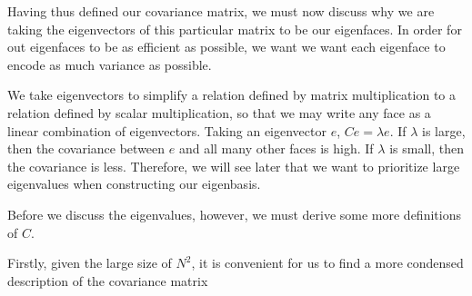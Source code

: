 \documentclass[12pt]{report}
\begin{document}
            Having thus defined our covariance matrix, we must now discuss why we are taking the eigenvectors of this particular matrix to be our eigenfaces. In order for out eigenfaces to be as efficient as possible, we want we want each eigenface to encode as much variance as possible. 
            
            We take eigenvectors to simplify a relation defined by matrix multiplication to a relation defined by scalar multiplication, so that we may write any face as a linear combination of eigenvectors. Taking an eigenvector $e$, $C e = \lambda e$. If $\lambda$ is large, then the covariance between $e$ and all many other faces is high. If $\lambda$ is small, then the covariance is less. Therefore, we will see later that we want to prioritize large eigenvalues when constructing our eigenbasis. 
            
            Before we discuss the eigenvalues, however, we must derive some more definitions of $C$.
            
            Firstly, given the large size of $N^2$, it is convenient for us to find a more condensed description of the covariance matrix
    
\end{document}
